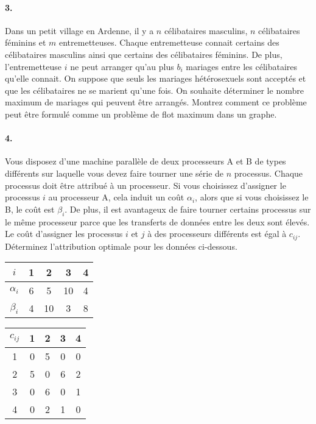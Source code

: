 \paragraph{3. } Dans un petit village en Ardenne, il y a $n$ célibataires masculins, $n$ célibataires féminins et $m$ entremetteuses. Chaque entremetteuse connait certains des célibataires masculins ainsi que certains des célibataires féminins. De plus, l'entremetteuse $i$ ne peut arranger qu'au plus $b_i$ mariages entre les célibataires qu'elle connait. On suppose que seuls les mariages hétérosexuels sont acceptés et que les célibataires ne se marient qu'une fois. On souhaite déterminer le nombre maximum de mariages qui peuvent être arrangés. Montrez comment ce problème peut être formulé comme un problème de flot maximum dans un graphe. 

\paragraph{4. } Vous disposez d'une machine parallèle de deux processeurs A et B de types différents sur laquelle vous devez faire tourner une série de $n$ processus. Chaque processus doit être attribué à un processeur. Si vous choisissez d'assigner le processus $i$ au processeur A, cela induit un coût $\alpha_i$, alors que si vous choisissez le B, le coût est $\beta_i$. De plus, il est avantageux de faire tourner certains processus sur le même processeur parce que les transferts de données entre les deux sont élevés. Le coût d'assigner les processus $i$ et $j$ à des processeurs différents est égal à $c_{ij}$. Déterminez l'attribution optimale pour les données ci-dessous. 

\begin{multicols}{2}

\begin{center}
\begin{tabular}{||c||c|c|c|c||}
\hline
$i$ & 1 & 2 & 3 & 4 \\ 
\hline
$\alpha_i$ & 6 & 5 & 10 & 4 \\
\hline
$\beta_i$ & 4 & 10 & 3 & 8 \\
\hline
\end{tabular}
\end{center}

\columnbreak


\begin{center}
\begin{tabular}{||c||c|c|c|c||}
\hline
$c_{ij}$ & 1 & 2 & 3 & 4 \\ 
\hline
1 & 0 & 5 & 0 & 0 \\
\hline
2 & 5 & 0 & 6 & 2 \\
\hline
3 & 0 & 6 & 0 & 1 \\
\hline 
4 & 0 & 2 & 1 & 0 \\
\hline
\end{tabular}
\end{center}

\end{multicols}

